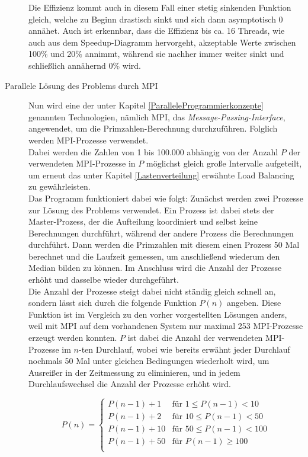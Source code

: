 \begin{description}
						Die Effizienz kommt auch in diesem Fall einer stetig sinkenden Funktion gleich, welche zu Beginn drastisch sinkt und sich dann asymptotisch 0 annähet. Auch ist erkennbar, dass die Effizienz bis ca. 16 Threads, wie auch aus dem Speedup-Diagramm hervorgeht, akzeptable Werte zwischen 100\% und 20\% annimmt, während sie nachher immer weiter sinkt und schließlich annähernd 0\% wird.

					\item[Parallele Lösung des Problems durch MPI]
					
						Nun wird eine der unter Kapitel \ref{ParalleleProgrammierkonzepte} genannten Technologien, nämlich MPI, das \textit{Message-Passing-Interface}, angewendet, um die Primzahlen-Berechnung durchzuführen. Folglich werden MPI-Prozesse verwendet.\\
						Dabei werden die Zahlen von 1 bis 100.000 abhängig von der Anzahl $P$ der verwendeten MPI-Prozesse in $P$ möglichst gleich große Intervalle aufgeteilt, um erneut das unter Kapitel \ref{Lastenverteilung} erwähnte Load Balancing zu gewährleisten.\\
						Das Programm funktioniert dabei wie folgt: Zunächst werden zwei Prozesse zur Lösung des Problems verwendet. Ein Prozess ist dabei stets der Master-Prozess, der die Aufteilung koordiniert und selbst keine Berechnungen durchführt, während der andere Prozess die Berechnungen durchführt. Dann werden die Primzahlen mit diesem einen Prozess 50 Mal berechnet und die Laufzeit gemessen, um anschließend wiederum den Median bilden zu können. Im Anschluss wird die Anzahl der Prozesse erhöht und dasselbe wieder durchgeführt.\\
						Die Anzahl der Prozesse steigt dabei nicht ständig gleich schnell an, sondern lässt sich durch die folgende Funktion $P(n)$ angeben. Diese Funktion ist im Vergleich zu den vorher vorgestellten Lösungen anders, weil mit MPI auf dem vorhandenen System nur maximal 253 MPI-Prozesse erzeugt werden konnten. $P$ ist dabei die Anzahl der verwendeten MPI-Prozesse im $n$-ten Durchlauf, wobei wie bereits erwähnt jeder Durchlauf nochmals 50 Mal unter gleichen Bedingungen wiederholt wird, um Ausreißer in der Zeitmessung zu eliminieren, und in jedem Durchlaufswechsel die Anzahl der Prozesse erhöht wird.
						
						\begin{equation}
							P(n) =
							\begin{cases}
								P(n - 1) + 1 & \text{für } 1 \leq P(n - 1) < 10\\
								P(n - 1) + 2 & \text{für } 10 \leq P(n - 1) < 50\\
								P(n - 1) + 10 & \text{für } 50 \leq P(n - 1) < 100\\
								P(n - 1) + 50 & \text{für } P(n - 1) \geq 100\\
							\end{cases}
						\end{equation}
						

\end{description}
